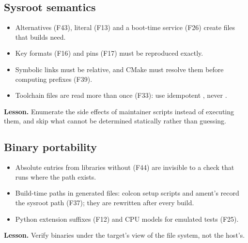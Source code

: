 \documentclass[11pt,a4paper]{article}
\newcommand{\finding}[1]{\textsf{\small F#1}}
\begin{document}
\subsection{Sysroot semantics}
\begin{itemize}
  \item Alternatives (\finding{43}), literal  (\finding{13}) and a boot-time service (\finding{26}) create
        files that builds need.
  \item Key formats (\finding{16}) and pins (\finding{17}) must be reproduced exactly.
  \item Symbolic links must be relative, and CMake must resolve them before computing prefixes (\finding{39}).
  \item Toolchain files are read more than once (\finding{33}): use idempotent , never .
\end{itemize}
\begin{lesson}\textbf{Lesson.} Enumerate the side effects of maintainer scripts instead of executing them, and skip what
cannot be determined statically rather than guessing.\end{lesson}

\subsection{Binary portability}
\begin{itemize}
  \item Absolute  entries from libraries without  (\finding{44}) are invisible to a check that
        runs where the path exists.
  \item Build-time paths in generated files: colcon setup scripts and ament's  record the sysroot
        path (\finding{37}); they are rewritten after every build.
  \item Python extension suffixes (\finding{12}) and CPU models for emulated tests (\finding{25}).
\end{itemize}
\begin{lesson}\textbf{Lesson.} Verify binaries under the target's view of the file system, not the host's.\end{lesson}
\end{document}
